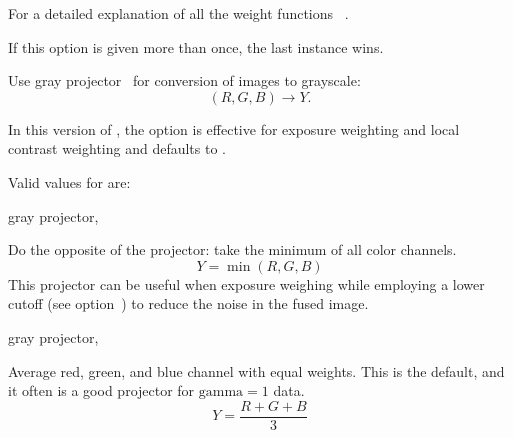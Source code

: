 \begin{codelist}
\begin{table}
    \caption[Exposure weight functions]{\label{tab:exposure-weight-functions}%
      Predefined exposure weight functions.  For a graphical comparison see
      \figureName~\ref{fig:exposure-weights}.}
  \end{table}

  For a detailed explanation of all the weight functions
  \sectionName~.

  If this option is given more than once, the last instance wins.


  \label{opt:gray-projector}%
\item[--gray-projector=\metavar{PROJECTOR}]\itemend
  Use gray projector~ for conversion of  images to grayscale:
  \[
  (R, G, B) \rightarrow Y.
  \]

  In this version of \App{}, the option is effective for exposure weighting and local contrast
  weighting and  defaults to .

  Valid values for  are:

  \begin{codelist}
           {gray projector, }%
  \item[anti-value]\itemend
    Do the opposite of the  projector: take the minimum of all color channels.
    \[
    Y = \min(R, G, B)
    \]
    This projector can be useful when exposure weighing while employing a lower cutoff (see
    option~) to reduce the noise in the fused image.

           {gray projector, }%
  \item[average]\itemend
    Average red, green, and blue channel with equal weights.  This is the default, and it often
    is a good projector for $\mbox{gamma} = 1$ data.
    \[
    Y = \frac{R + G + B}{3}
    \]


\end{codelist}
\end{codelist}
